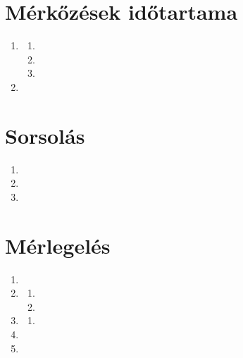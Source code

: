 \documentclass[]{report}
\begin{document}
\chapter{Mérkőzések időtartama}

\begin{enumerate}
\item


  \begin{enumerate}
  \item
  
  \item
  
  \item
  
  \end{enumerate}
\item

\end{enumerate}


\chapter{Sorsolás}

\begin{enumerate}
\item

\item

\item

\end{enumerate}


\chapter{Mérlegelés}

\begin{enumerate}
\item

\item


  \begin{enumerate}
  \item
  
  \item
  
  \end{enumerate}

\item


  \begin{enumerate}
  \item
  
  \end{enumerate}

\item

\item

\end{enumerate}
\end{document}
